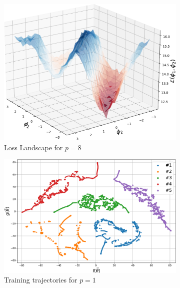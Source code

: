 \documentclass[%
 reprint,
 amsmath,
 amssymb,
 showkeys,
 pra,
 floatfix,
]{revtex4-2}
\begin{document}
\begin{figure}[htp]
    \begin{subfigure}[b]{0.32\linewidth}
        \includegraphics[width=\textwidth]{images/loss_landscape_p3.pdf}
        \caption{Loss Landscape for $p=8$\label{fig:loss-p8}}
    \end{subfigure}%
    \hfill\newline
    \begin{subfigure}[b]{0.32\linewidth}
        \includegraphics[width=\textwidth]{images/training_trajectory_p1.pdf}
        \caption{Training trajectories for $p=1$\label{fig:train-p1}}
    \end{subfigure}
    \begin{subfigure}[b]{0.32\linewidth}

\end{subfigure}
\end{figure}
\end{document}
